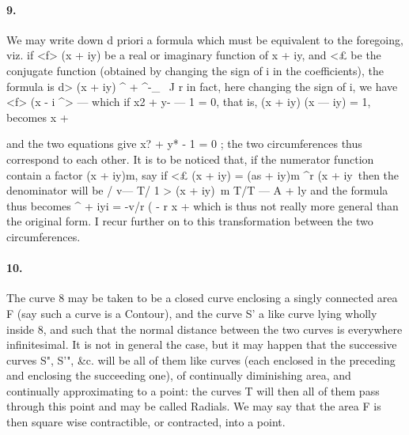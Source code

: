 \documentclass[11pt,a4paper]{book}
\begin{document}
{{{{{{\paragraph{9.} We  may  write  down  d  priori  a  formula  which  must  be  equivalent  to  the
foregoing,  viz.  if  <f>  (x  +  iy)  be  a  real  or  imaginary  function  of  x  +  iy,  and  <£  be  the
conjugate  function  (obtained  by  changing  the  sign  of  i  in  the  coefficients),  the  formula  is
d>  (x  +  iy)
^  +  ^-\_~
J
r
in  fact,  here  changing  the  sign  of  i,  we  have
<f>  (x  -  i
^>   ---
which
if  x2  +  y-  ---  1  =  0,  that  is,  (x  +  iy)  (x  ---  iy)  =  1,  becomes
x  +


and    the    two    equations   give   x?  +  y*  -  1  =  0 ;    the    two    circumferences  thus    correspond
to    each    other.      It    is    to    be    noticed    that,    if  the    numerator    function  contain   a   factor
(x  +  iy)m,   say    if  <£  (x  +  iy)  =  (as  +  iy)m  ^r  (x  +  iy\    then    the    denominator  will    be
/             v--- T/      1     >
(x  +  iy)~m  T/T    ---
A
+  ly
and  the  formula  thus  becomes
^  +  iyi  =
-v/r  (
-
r  x  +
which  is  thus  not  really  more  general  than  the  original  form.  I  recur  further  on
to  this  transformation  between  the  two  circumferences.
\paragraph{10.} The   curve   8  may   be  taken  to  be  a  closed  curve  enclosing  a  singly  connected
area  F  (say   such    a   curve   is   a   Contour),  and    the  curve   S'  a  like  curve  lying  wholly
inside   8,   and   such    that   the   normal   distance    between    the    two    curves    is    everywhere
infinitesimal.      It   is   not   in   general   the   case,   but   it   may   happen   that    the    successive
curves   S",   S'",   \&c.   will   be   all   of    them   like   curves   (each    enclosed    in    the   preceding
and    enclosing    the    succeeding    one),    of    continually    diminishing    area,   and    continually
approximating    to    a    point:    the    curves    T    will    then    all    of    them    pass    through    this
point   and   may   be   called    Radials.     We    may   say    that   the  area  F  is   then    square  wise
contractible,  or  contracted,  into  a  point.
}}}}}}
\end{document}
